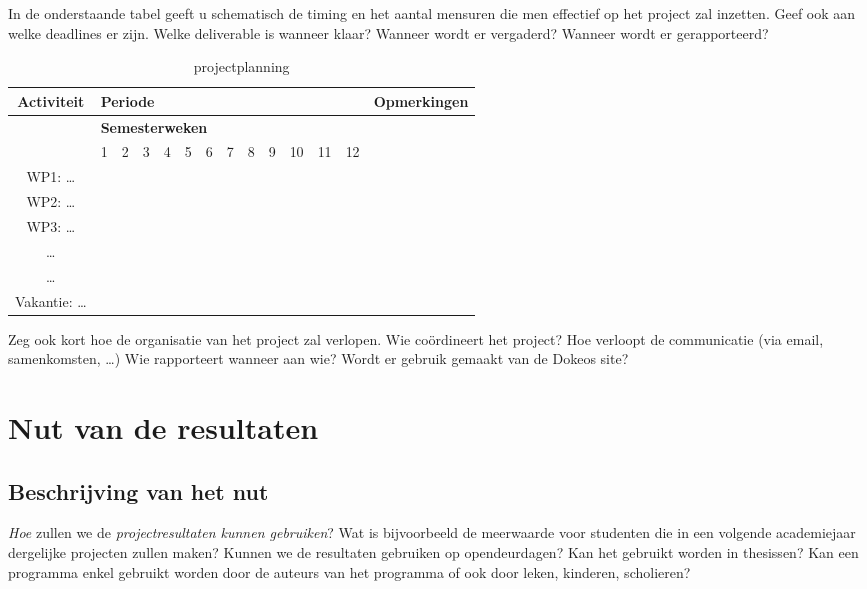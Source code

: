 \documentclass[10pt]{article}
\begin{document}
In de onderstaande tabel geeft u schematisch de timing en het aantal mensuren die men effectief op het project zal inzetten. Geef ook aan welke deadlines er zijn. Welke deliverable is wanneer klaar? Wanneer wordt er vergaderd? Wanneer wordt er gerapporteerd?

\begin{table}[h]
	\centering
		\begin{tabular}{|*{14}{c|}}
		\hline
		\textbf{Activiteit} & \multicolumn{12}{l|}{\textbf{Periode}} & \textbf{Opmerkingen} \\
		\hline
							 & \multicolumn{12}{l|}{\textbf{Semesterweken}} &   \\
		\hline 
		  & 1	& 2	& 3	& 4	& 5	& 6	& 7	& 8	& 9	& 10 & 11	& 12 & \\
		\hline 
		WP1: \ldots & & & & & & & & & & & & & \\
		\hline 
		WP2: \ldots & & & & & & & & & & & & & \\
		\hline 
		WP3: \ldots & & & & & & & & & & & & & \\
		\hline 
		 \ldots & & & & & & & & & & & & & \\
		\hline 
		 \ldots & & & & & & & & & & & & & \\
		\hline 
		Vakantie: \ldots & & & & & & & & & & & & & \\
		\hline
		\end{tabular}
	\caption{projectplanning}
	\label{tab:projectplanning}
\end{table}
																							

Zeg ook kort hoe de organisatie van het project zal verlopen. Wie co\"ordineert het project? Hoe verloopt de communicatie (via email, samenkomsten, \ldots) Wie rapporteert wanneer aan wie? Wordt er gebruik gemaakt van de Dokeos site?


\section{Nut van de resultaten}\label{sec:Nut}

\subsection{Beschrijving van het nut}\label{sec:BeschrijvingNut}

\emph{Hoe} zullen we de \emph{projectresultaten kunnen gebruiken}? Wat is bijvoorbeeld de meerwaarde voor studenten die in een volgende academiejaar dergelijke projecten zullen maken? Kunnen we de resultaten gebruiken op opendeurdagen? Kan het gebruikt worden in thesissen? Kan een programma enkel gebruikt worden door de auteurs van het programma of ook door leken, kinderen, scholieren?
\end{document}
